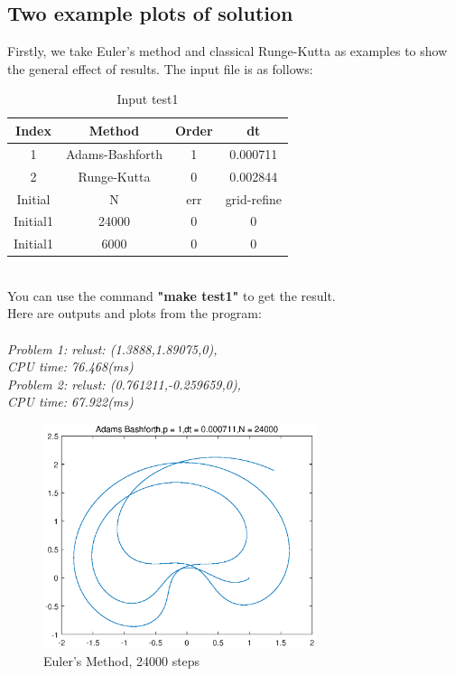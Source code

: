 \documentclass[a4paper,twocolumn]{article}
\theoremstyle{definition}
\begin{document}
\subsection{Two example plots of solution}
Firstly, we take Euler's method and classical Runge-Kutta as examples to show the general effect of results. The input file is as follows:\\
\begin{table}[!htp]
	\centering
	\begin{tabular}{|c|c|c|c|}
		\hline	
		Index & Method & Order & dt \\
		\hline		
		1 & Adams-Bashforth & 1 & 0.000711   \\	
		\hline		
		2 & Runge-Kutta & 0 & 0.002844   \\	
		\hline \hline
		Initial & N & err & grid-refine \\
		\hline
		Initial1 & 24000 & 0 & 0 \\
		\hline
		Initial1 & 6000 & 0 & 0 \\
		\hline
	\end{tabular}
	\caption{Input test1}
	\label{tab:test1}
\end{table}\\
You can use the command \textbf{"make test1"} to get the result.\\
Here are outputs and plots from the program:\\\\
\emph{Problem 1: relust: (1.3888,1.89075,0),}\\
\emph{CPU time: 76.468(ms)}\\
\emph{Problem 2: relust: (0.761211,-0.259659,0),}\\
\emph{CPU time: 67.922(ms)}\\
\begin{figure}[!htp]   
	\centering
	\includegraphics[width=8cm]{Pictures/1_1.eps}
	\caption{Euler's Method, 24000 steps}
	\label{fig:Euler24000}
\end{figure}
\end{document}
